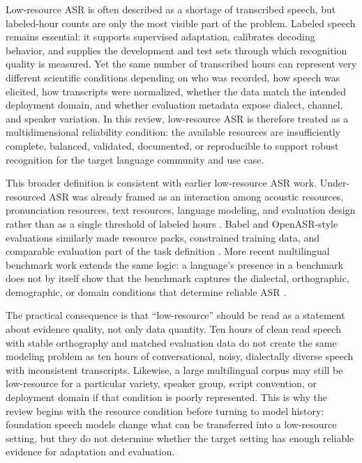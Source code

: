 \documentclass[pdflatex,sn-basic,iicol]{sn-jnl}
\theoremstyle{thmstyleone}
\theoremstyle{thmstyletwo}
\theoremstyle{thmstylethree}
\begin{document}
Low-resource ASR is often described as a shortage of transcribed speech, but labeled-hour counts are only the most visible part of the problem. Labeled speech remains essential: it supports supervised adaptation, calibrates decoding behavior, and supplies the development and test sets through which recognition quality is measured. Yet the same number of transcribed hours can represent very different scientific conditions depending on who was recorded, how speech was elicited, how transcripts were normalized, whether the data match the intended deployment domain, and whether evaluation metadata expose dialect, channel, and speaker variation. In this review, low-resource ASR is therefore treated as a multidimensional reliability condition: the available resources are insufficiently complete, balanced, validated, documented, or reproducible to support robust recognition for the target language community and use case.

This broader definition is consistent with earlier low-resource ASR work. Under-resourced ASR was already framed as an interaction among acoustic resources, pronunciation resources, text resources, language modeling, and evaluation design rather than as a single threshold of labeled hours \citep{besacier2014_underresourced_asr_survey}. Babel and OpenASR-style evaluations similarly made resource packs, constrained training data, and comparable evaluation part of the task definition \citep{gales2014_babel_project_research_cued,peterson2022_openasr21}. More recent multilingual benchmark work extends the same logic: a language's presence in a benchmark does not by itself show that the benchmark captures the dialectal, orthographic, demographic, or domain conditions that determine reliable ASR \citep{chen2025mlsuperb2challenge}.

The practical consequence is that ``low-resource'' should be read as a statement about evidence quality, not only data quantity. Ten hours of clean read speech with stable orthography and matched evaluation data do not create the same modeling problem as ten hours of conversational, noisy, dialectally diverse speech with inconsistent transcripts. Likewise, a large multilingual corpus may still be low-resource for a particular variety, speaker group, script convention, or deployment domain if that condition is poorly represented. This is why the review begins with the resource condition before turning to model history: foundation speech models change what can be transferred into a low-resource setting, but they do not determine whether the target setting has enough reliable evidence for adaptation and evaluation.
\end{document}

